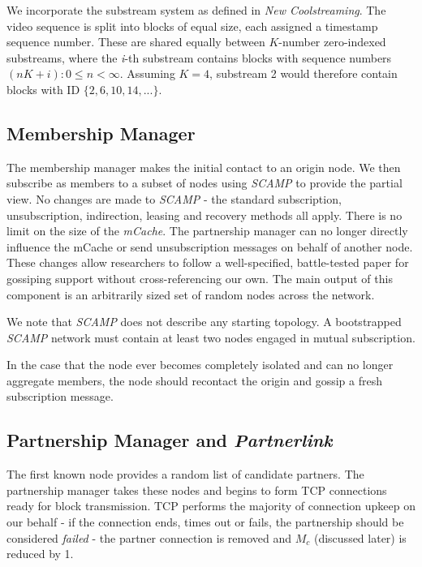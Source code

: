 \documentclass[12pt,a4paper]{article}
\begin{document}
We incorporate the substream system as defined in \textit{New Coolstreaming}. The video sequence is split into blocks of equal size, each assigned a timestamp sequence number. These are shared equally between \(K\)-number zero-indexed substreams, where the \textit{i}-th substream contains blocks with sequence numbers \((nK + \textit{i}) : 0 \leq n < \infty\). Assuming \(K = 4\), substream 2 would therefore contain blocks with ID \(\{2, 6, 10, 14, ...\}\).

\subsection{Membership Manager} \label{css:membership}
The membership manager makes the initial contact to an origin node. We then subscribe as members to a subset of nodes using \textit{SCAMP} to provide the partial view. No changes are made to \textit{SCAMP} - the standard subscription, unsubscription, indirection, leasing and recovery methods all apply. There is no limit on the size of the \textit{mCache}. The partnership manager can no longer directly influence the mCache or send unsubscription messages on behalf of another node. These changes allow researchers to follow a well-specified, battle-tested paper for gossiping support without cross-referencing our own. The main output of this component is an arbitrarily sized set of random nodes across the network.

We note that \textit{SCAMP} does not describe any starting topology. A bootstrapped \textit{SCAMP} network must contain at least two nodes engaged in mutual subscription.

In the case that the node ever becomes completely isolated and can no longer aggregate members, the node should recontact the origin and gossip a fresh subscription message.

\subsection{Partnership Manager and \textit{Partnerlink}} \label{css:partnerlink}
The first known node provides a random list of candidate partners. The partnership manager takes these nodes and begins to form TCP connections ready for block transmission. TCP performs the majority of connection upkeep on our behalf - if the connection ends, times out or fails, the partnership should be considered \textit{failed} - the partner connection is removed and \(M_c\) (discussed later) is reduced by 1.
\end{document}
